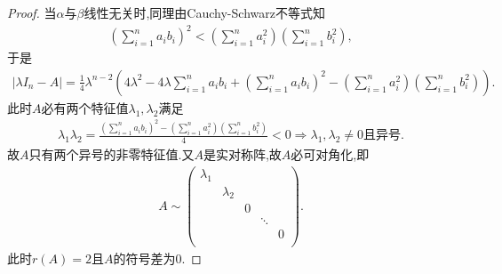 \documentclass[../../main.tex]{subfiles}%
\begin{document}
\begin{proof}
当$\alpha$与$\beta$线性无关时,同理由Cauchy-Schwarz不等式知
\begin{align*}
\left( \sum\limits_{i=1}^n{a_ib_i} \right) ^2<\left( \sum\limits_{i=1}^n{a_{i}^{2}} \right) \left( \sum\limits_{i=1}^n{b_{i}^{2}} \right),
\end{align*}
于是
\begin{align*}
| \lambda I_n-A |=\frac{1}{4}\lambda ^{n-2}\left( 4\lambda ^2-4\lambda \sum\limits_{i=1}^n{a_ib_i}+\left( \sum\limits_{i=1}^n{a_ib_i} \right) ^2-\left( \sum\limits_{i=1}^n{a_{i}^{2}} \right) \left( \sum\limits_{i=1}^n{b_{i}^{2}} \right) \right).
\end{align*}
此时$A$必有两个特征值$\lambda _1,\lambda _2$满足
\begin{align*}
\lambda _1\lambda _2=\frac{\left( \sum\limits_{i=1}^n{a_ib_i} \right) ^2-\left( \sum\limits_{i=1}^n{a_{i}^{2}} \right) \left( \sum\limits_{i=1}^n{b_{i}^{2}} \right)}{4}<0\Longrightarrow \lambda _1,\lambda _2\ne 0\text{且异号}.
\end{align*}
故$A$只有两个异号的非零特征值.又$A$是实对称阵,故$A$必可对角化,即
\begin{align*}
A\sim \begin{pmatrix}
\lambda _1&		&		&		&		\\
&		\lambda _2&		&		&		\\
&		&		0&		&		\\
&		&		&		\ddots&		\\
&		&		&		&		0\\
\end{pmatrix}.
\end{align*}
此时$r( A ) =2$且$A$的符号差为$0.$

\end{proof}
\end{document}
